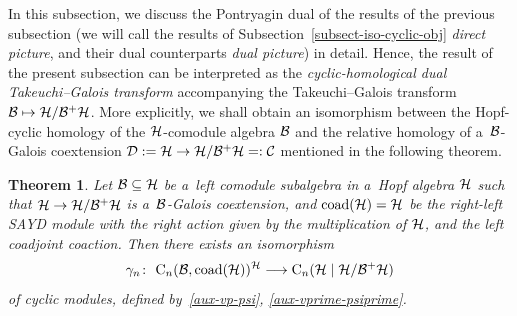 \documentclass[pdftex]{sigma}
\numberwithin{equation}{section}
\newtheorem{Theorem}{Theorem}[section]
\begin{document}
In this subsection, we discuss the Pontryagin dual of the results of the previous subsection (we will call the results
of Subsection~\ref{subsect-iso-cyclic-obj} \emph{direct picture}, and their dual counterparts \emph{dual picture}) in
detail.
Hence, the result of the present subsection can be interpreted as the \emph{cyclic-homological dual Takeuchi--Galois
transform} accompanying the Takeuchi--Galois transform ${\cal B}\mapsto{\cal H}/{\cal B}^{+}{\cal H}$.
More explicitly, we shall obtain an isomorphism between the Hopf-cyclic homology of the ${\cal H}$-comodule algebra
${\cal B}$ and the relative homology of a~${\cal B}$-Galois coextension ${\cal D}:={\cal H} \to {\cal H}/{\cal
B}^{+}{\cal H}=:{\cal C}$ mentioned in the following theorem.
\begin{Theorem}
\label{dualpict}
Let ${\cal B}\subseteq {\cal H}$ be a~left comodule subalgebra in a~Hopf algebra ${\cal H}$ such that ${\cal
H}\rightarrow {\cal H}/{\cal B}^{+}{\cal H}$ is a~${\cal B}$-Galois coextension, and ${\rm coad}({\cal H})={\cal H}$ be
the right-left SAYD module with the right action given by the multiplication of ${\cal H}$, and the left coadjoint
coaction.
Then there exists an isomorphism
\begin{gather*}
\gamma_{n}\colon \ {\rm C}_{n}({\cal B}, {\rm coad}({\cal H}))^{{\cal H}} \longrightarrow {\rm C}_{n}({\cal H}\mid {\cal
H}/{\cal B}^{+}{\cal H})
\end{gather*}
of cyclic modules, defined by~\eqref{aux-vp-psi}, \eqref{aux-vprime-psiprime}.
\end{Theorem}
\end{document}
